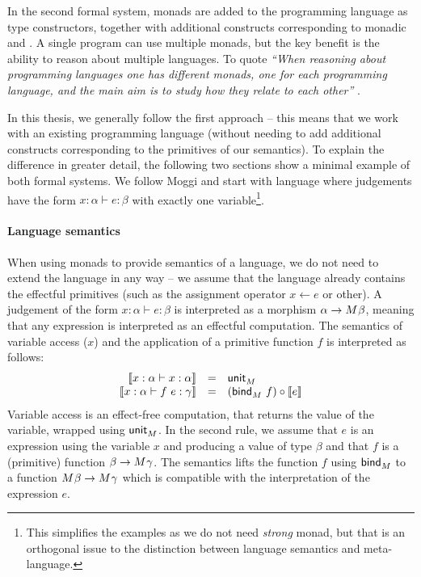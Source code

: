 In the second formal system, monads are added to the programming language as type constructors, 
together with additional constructs corresponding to monadic  and .
A single program can use multiple monads, but the key benefit is the ability to reason
about multiple languages. To quote \emph{``When reasoning about programming languages one has different 
monads, one for each programming language, and the main aim is to study how they relate to each 
other''} \cite[p. 5]{monad-notions}.

In this thesis, we generally follow the first approach -- this means that we work with an existing
programming language (without needing to add additional constructs corresponding to the primitives
of our semantics). To explain the difference in greater detail, the following two sections show a
minimal example of both formal systems. We follow Moggi and start with language where judgements have
the form $x:\alpha \vdash e : \beta$ with exactly one variable\footnote{This simplifies the examples
as we do not need \emph{strong} monad, but that is an orthogonal issue to the distinction between
language semantics and meta-language.}.


\paragraph{Language semantics} When using monads to provide semantics of a language, we do not
need to extend the language in any way -- we assume that the language already contains the 
effectful primitives (such as the assignment operator $x \leftarrow e$ or other). A judgement
of the form $x:\alpha \vdash e : \beta$ is interpreted as a morphism $\alpha \rightarrow M^{}\beta$,
meaning that any expression is interpreted as an effectful computation. The semantics of variable
access ($x$) and the application of a primitive function $f$ is interpreted as follows:
%
\begin{equation*}
\begin{array}{rcl}
\llbracket x:\alpha \vdash x : \alpha \rrbracket &=& \textnormal{\sffamily unit}_M^{}\\
\llbracket x:\alpha \vdash f~e : \gamma \rrbracket &=& (\textnormal{\sffamily bind}_M^{}~f) \circ \llbracket e \rrbracket\\
\end{array}
\end{equation*}
%
Variable access is an effect-free computation, that returns the value of the variable, wrapped
using $\textnormal{\sffamily unit}_M^{}$. In the second rule, we assume that $e$ is an expression using
the variable $x$ and producing a value of type $\beta$ and that $f$ is a (primitive) function
$\beta \rightarrow M^{}\gamma$. The semantics lifts the function $f$ using $\textnormal{\sffamily bind}_M^{}$
to a function $M^{}\beta \rightarrow M^{}\gamma$ which is compatible with the 
interpretation of the expression $e$.

